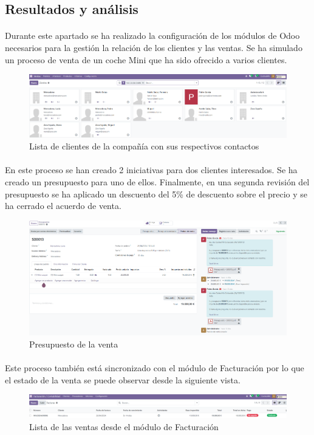 \subsection{Resultados y análisis}
\paragraph{}
Durante este apartado se ha realizado la configuración de los módulos de Odoo necesarios para la gestión la relación de los clientes y las ventas. Se ha simulado un proceso de venta de un coche Mini que ha sido ofrecido a varios clientes.
\begin{figure}[h]
    \centering
    \includegraphics[width=1\linewidth]{fotosRelacion/clientes.png}
    \caption{Lista de clientes de la compañía con sus respectivos contactos}
    \label{fig:enter-label}
\end{figure}
\paragraph{}    
En este proceso se han creado 2 iniciativas para dos clientes interesados. Se ha creado un presupuesto para uno de ellos. Finalmente, en una segunda revisión del presupuesto se ha aplicado un descuento del 5\% de descuento sobre el precio y se ha cerrado el acuerdo de venta.
\begin{figure}[h]
    \centering
    \includegraphics[width=1\linewidth]{fotosRelacion/presupuesto.png}
    \caption{Presupuesto de la venta}
    \label{fig:enter-label}
\end{figure}
\paragraph{}
Este proceso también está sincronizado con el módulo de Facturación por lo que el estado de la venta se puede observar desde la siguiente vista.
\newpage
\begin{figure}[h]
    \centering
    \includegraphics[width=1\linewidth]{fotosRelacion/facturacion.png}
    \caption{Lista de las ventas desde el módulo de Facturación}
    \label{fig:enter-label}
\end{figure}

